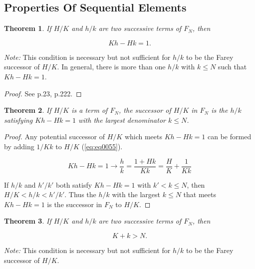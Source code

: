 \documentclass{esub2acm}
\newtheorem{mytheorem}{Theorem}
\begin{document}
\subsection{Properties Of Sequential Elements}

\begin{mytheorem}
\label{thm:thm01}
If $H/K$ and $h/k$ are two successive terms of $F_{N}$,
then
\end{mytheorem}

\begin{equation}
\label{eq:eq0048}
K h - H k = 1.
\end{equation}

\emph{Note:} This condition is necessary but not
sufficient for $h/k$ to be the Farey successor of $H/K$.
In general, there is
more than one $h/k$ with $k \leq N$ such that $Kh - Hk = 1$.

\begin{proof}
See \cite{HardyAndWrightClassic} p.23, \cite{LeVeque} p.222.
\end{proof}

\begin{mytheorem}
\label{thm:thm05}
If $H/K$ is a term of $F_{N}$,
the successor of $H/K$
in $F_{N}$ is the $h/k$ satisfying
$Kh-Hk=1$ with the largest
denominator $k\leq N$.
\end{mytheorem}

\begin{proof}
Any potential successor of $H/K$
which meets $Kh-Hk=1$ can be formed
by adding $1/Kk$ to $H/K$
(\ref{eq:eq0055}).

\begin{equation}
\label{eq:eq0055}
Kh - Hk = 1 \to  \frac{h}{k} = \frac{{1 + Hk}}{{Kk}} = \frac{H}{K} + \frac{1}{Kk}
\end{equation}

If $h/k$ and $h'/k'$ both
satisfy $Kh-Hk=1$ with $k'<k\leq{}N$, then
$H/K<h/k<h'/k'$.  Thus the $h/k$
with the largest $k \leq N$
that meets $Kh-Hk=1$ is the successor
in $F_{N}$ to $H/K$.
\end{proof}

\begin{mytheorem}
\label{thm:thm03}
If $H/K$ and $h/k$ are two successive terms of $F_{N}$, then
\end{mytheorem}

\begin{equation}
\label{eq:eq0050}
K + k > N.
\end{equation}

\emph{Note:} This condition is necessary but not
sufficient for $h/k$ to be the Farey successor of $H/K$.
\end{document}
